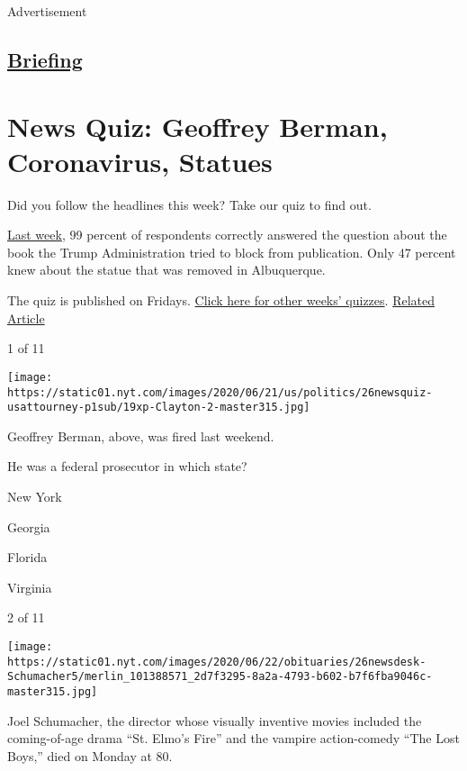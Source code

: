 Advertisement

\hypertarget{-briefing-}{%
\subsection{\texorpdfstring{
\href{/interactive/2018/briefing/global-morning-briefing-newsletter-signup.html}{Briefing}
}{ Briefing }}\label{-briefing-}}

\hypertarget{news-quiz-geoffrey-berman-coronavirus-statues}{%
\section{News Quiz: Geoffrey Berman, Coronavirus,
Statues}\label{news-quiz-geoffrey-berman-coronavirus-statues}}

Did you follow the headlines this week? Take our quiz to find out.

\href{https://www.nytimes.com/interactive/2020/06/19/briefing/supreme-court-coronavirus-north-korea-news-quiz.html}{Last
week}, 99 percent of respondents correctly answered the question about
the book the Trump Administration tried to block from publication. Only
47 percent knew about the statue that was removed in Albuquerque.

The quiz is published on Fridays.
\href{https://www.nytimes.com/spotlight/news-quiz}{Click here for other
weeks' quizzes}.
\href{https://www.nytimes.com/interactive/2020/06/19/briefing/supreme-court-coronavirus-north-korea-news-quiz.html}{Related
Article}

1 of 11

\texttt{[image: https://static01.nyt.com/images/2020/06/21/us/politics/26newsquiz-usattourney-p1sub/19xp-Clayton-2-master315.jpg]}

Geoffrey Berman, above, was fired last weekend.

He was a federal prosecutor in which state?

New York

Georgia

Florida

Virginia

2 of 11

\texttt{[image: https://static01.nyt.com/images/2020/06/22/obituaries/26newsdesk-Schumacher5/merlin\_101388571\_2d7f3295-8a2a-4793-b602-b7f6fba9046c-master315.jpg]}

Joel Schumacher, the director whose visually inventive movies included
the coming-of-age drama ``St. Elmo's Fire'' and the vampire
action-comedy ``The Lost Boys,'' died on Monday at 80.

